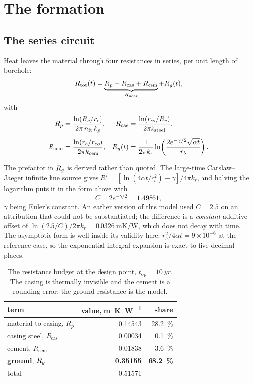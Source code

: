 \section{The formation}
\label{sec:formation}

\subsection{The series circuit}

Heat leaves the material through four resistances in series, per unit length
of borehole:
\begin{equation}
R_{\mathrm{tot}}(t) = \underbrace{R_p + R_{\mathrm{cas}} + R_{\mathrm{cem}}}_{R_{\mathrm{near}}}
  + R_{g}(t),
\end{equation}
with
\begin{align}
R_p &= \frac{\ln(R_c/r_e)}{2\pi\,n_{\mathrm{ft}}\,k_p},
&
R_{\mathrm{cas}} &= \frac{\ln(r_{co}/R_c)}{2\pi k_{\mathrm{steel}}},
\\[4pt]
R_{\mathrm{cem}} &= \frac{\ln(r_b/r_{co})}{2\pi k_{\mathrm{cem}}},
&
R_{g}(t) &= \frac{1}{2\pi k_r}
  \ln\!\left(\frac{2e^{-\gamma/2}\sqrt{\alpha t}}{r_b}\right).
\label{eq:Rg}
\end{align}

The prefactor in $R_{g}$ is derived rather than quoted. The large-time
Carslaw--Jaeger infinite line source gives
$R' = [\ln(4\alpha t/r_b^2)-\gamma]/4\pi k_r$, and halving the logarithm puts
it in the form above with
\begin{equation}
  C = 2e^{-\gamma/2} = 1.49861,
\end{equation}
$\gamma$ being Euler's constant. An earlier version of this model used
$C=2.5$ on an attribution that could not be substantiated; the difference is a
\emph{constant} additive offset of $\ln(2.5/C)/2\pi k_r =
\SI{0.0326}{\metre\kelvin\per\watt}$, which does not decay with time. The
asymptotic form is well inside its validity here: $r_b^2/4\alpha t =
9\times10^{-6}$ at the reference case, so the exponential-integral expansion
is exact to five decimal places.

\begin{table}[h]
\centering
\begin{tabular}{lrr}
\toprule
term & value, \si{\metre\kelvin\per\watt} & share \\
\midrule
material to casing, $R_p$      & 0.14543 & \SI{28.2}{\percent} \\
casing steel, $R_{\mathrm{cas}}$ & 0.00034 & \SI{0.1}{\percent} \\
cement, $R_{\mathrm{cem}}$     & 0.01838 & \SI{3.6}{\percent} \\
\textbf{ground}, $R_{g}$         & \textbf{0.35155} & \textbf{\SI{68.2}{\percent}} \\
\midrule
total                          & 0.51571 & \\
\bottomrule
\end{tabular}
\caption{The resistance budget at the design point, $t_{\mathrm{op}} =
\SI{10}{yr}$. The casing is thermally invisible and the cement is a rounding
error; the ground resistance is the model.}
\end{table}

